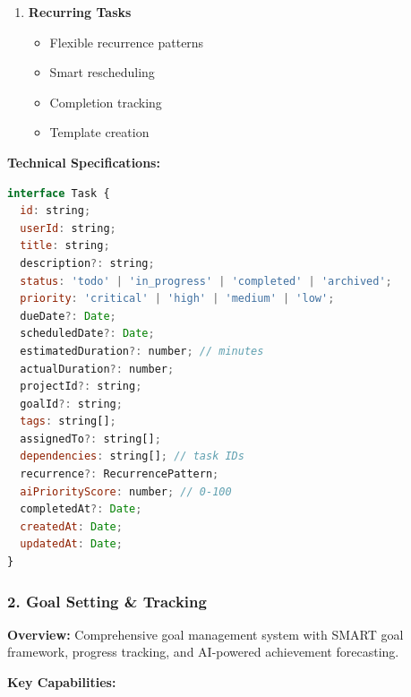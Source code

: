 \begin{enumerate}
    
    \item \textbf{Recurring Tasks}
    \begin{itemize}
        \item Flexible recurrence patterns
        \item Smart rescheduling
        \item Completion tracking
        \item Template creation
    \end{itemize}
\end{enumerate}

\textbf{Technical Specifications:}

\begin{lstlisting}[language=JavaScript, caption=Task Data Model]
interface Task {
  id: string;
  userId: string;
  title: string;
  description?: string;
  status: 'todo' | 'in_progress' | 'completed' | 'archived';
  priority: 'critical' | 'high' | 'medium' | 'low';
  dueDate?: Date;
  scheduledDate?: Date;
  estimatedDuration?: number; // minutes
  actualDuration?: number;
  projectId?: string;
  goalId?: string;
  tags: string[];
  assignedTo?: string[];
  dependencies: string[]; // task IDs
  recurrence?: RecurrencePattern;
  aiPriorityScore: number; // 0-100
  completedAt?: Date;
  createdAt: Date;
  updatedAt: Date;
}
\end{lstlisting}

\subsubsection{2. Goal Setting \& Tracking}

\textbf{Overview:}
Comprehensive goal management system with SMART goal framework, progress tracking, and AI-powered achievement forecasting.

\textbf{Key Capabilities:}

